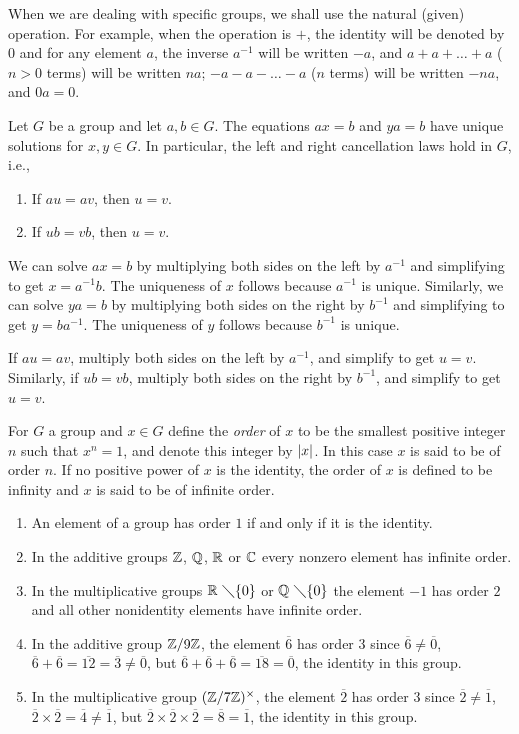 When we are dealing with specific groups, we shall use the natural (given) operation.
For example, when the operation is $+$, the identity will be denoted by $0$
and for any element $a$, the inverse $a^{-1}$ will be written $-a$,
and $a+a+\dots+a$ ($n>0$ terms) will be written $na$; $-a-a-\dots-a$ ($n$ terms)
will be written $-na$, and $0a = 0$.
{Let $G$ be a group and let $a,b\in G$. The equations $ax=b$ and $ya=b$
have unique solutions for $x,y\in G$.
In particular, the left and right cancellation laws hold in $G$, i.e.,
\begin{enumerate}[leftmargin=20pt, itemsep=0pt, topsep=0pt]
    \item If $au=av$, then $u=v$.
    \item If $ub=vb$, then $u=v$.
\end{enumerate}}
{We can solve $ax=b$ by multiplying both sides on the left by $a^{-1}$ and simplifying to get $x=a^{-1}b$.
The uniqueness of $x$ follows because $a^{-1}$ is unique.
Similarly, we can solve $ya=b$ by multiplying both sides on the right by $b^{-1}$ and simplifying to get $y=ba^{-1}$.
The uniqueness of $y$ follows because $b^{-1}$ is unique.

If $au=av$, multiply both sides on the left by $a^{-1}$, and simplify to get $u=v$.
Similarly, if $ub=vb$, multiply both sides on the right by $b^{-1}$, and simplify to get $u=v$.
}

{For $G$ a group and $x\in G$ define the {\sl order} of $x$ to be the smallest positive
integer $n$ such that $x^{n} = 1$, and denote this integer by $\left\vert x \right\vert$. In this case $x$
is said to be of order $n$. If no positive power of $x$ is the identity, the order of $x$ is defined to be infinity
and $x$ is said to be of infinite order.}

{\begin{enumerate}[leftmargin=20pt, itemsep=0pt, topsep=0pt]
    \item An element of a group has order $1$ if and only if it is the identity.
    \item In the additive groups $\mathbb{Z}$, $\mathbb{Q}$, $\mathbb{R}$ or $\mathbb{C}$ every nonzero
    element has infinite order.
    \item In the multiplicative groups $\mb{R}\ \diagdown\{0\}$ or $\mb{Q}\ \diagdown\{0\}$ the element
    $-1$ has order $2$ and all other nonidentity elements have infinite order.
    \item In the additive group $\mathbb{Z}/9\mathbb{Z}$, the element $\overline{6}$ has order $3$
    since $\overline{6}\neq \overline{0}$, $\overline{6} + \overline{6} = \overline{12} = \overline{3} \neq \overline{0}$,
    but $\overline{6} + \overline{6} + \overline{6} = \overline{18} = \overline{0}$, the identity in this group.
    \item In the multiplicative group $(\mathbb{Z}/7\mathbb{Z})^{\times}$, the element $\overline{2}$ has order $3$
    since $\overline{2}\neq \overline{1}$, $\overline{2}\times \overline{2} = \overline{4}\neq \overline{1}$,
    but $\overline{2}\times \overline{2}\times \overline{2} = \overline{8} = \overline{1}$, the identity in this group.
\end{enumerate}
}

